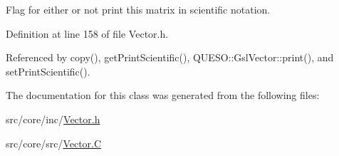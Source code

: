 Flag for either or not print this matrix in scientific notation. 



Definition at line 158 of file Vector.\-h.



Referenced by copy(), get\-Print\-Scientific(), Q\-U\-E\-S\-O\-::\-Gsl\-Vector\-::print(), and set\-Print\-Scientific().



The documentation for this class was generated from the following files\-:\begin{DoxyCompactItemize}
\item 
src/core/inc/\hyperlink{_vector_8h}{Vector.\-h}\item 
src/core/src/\hyperlink{_vector_8_c}{Vector.\-C}\end{DoxyCompactItemize}
